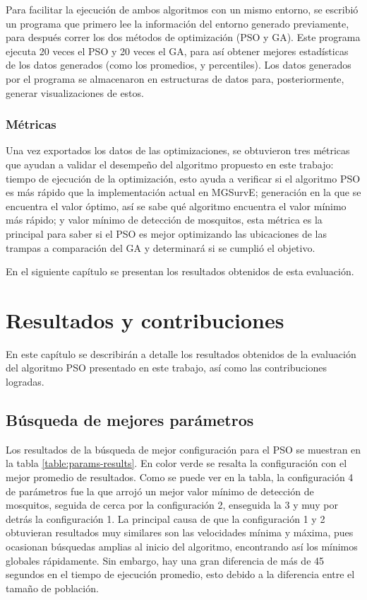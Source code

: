 \documentclass[letterpaper]{report}
\begin{document}
    Para facilitar la ejecución de ambos algoritmos con un mismo entorno, se
    escribió un programa que primero lee la información del entorno generado
    previamente, para después correr los dos métodos de optimización (PSO y
    GA). Este programa ejecuta 20 veces el PSO y 20 veces el GA, para así
    obtener mejores estadísticas de los datos generados (como los promedios, y
    percentiles). Los datos generados por el programa se almacenaron en
    estructuras de datos para, posteriormente, generar visualizaciones de estos.

    \subsection{Métricas}

    Una vez exportados los datos de las optimizaciones, se obtuvieron tres
    métricas que ayudan a validar el desempeño del algoritmo propuesto en este
    trabajo: tiempo de ejecución de la optimización, esto ayuda a verificar si
    el algoritmo PSO es más rápido que la implementación actual en MGSurvE;
    generación en la que se encuentra el valor óptimo, así se sabe qué algoritmo
    encuentra el valor mínimo más rápido; y valor mínimo de detección de
    mosquitos, esta métrica es la principal para saber si el PSO es mejor
    optimizando las ubicaciones de las trampas a comparación del GA y
    determinará si se cumplió el objetivo.

    En el siguiente capítulo se presentan los resultados obtenidos de esta
    evaluación.

\chapter{Resultados y contribuciones}
  En este capítulo se describirán a detalle los resultados obtenidos de la
  evaluación del algoritmo PSO presentado en este trabajo, así como las
  contribuciones logradas.

  \section{Búsqueda de mejores parámetros}\label{sect:busqueda-mejores-params}
    Los resultados de la búsqueda de mejor configuración para el PSO se muestran
    en la tabla \ref{table:params-results}. En color verde se resalta la
    configuración con el mejor promedio de resultados. Como se puede ver en la
    tabla, la configuración 4 de parámetros fue la que arrojó un mejor valor
    mínimo de detección de mosquitos, seguida de cerca por la configuración 2,
    enseguida la 3 y muy por detrás la configuración 1. La principal causa de
    que la configuración 1 y 2 obtuvieran resultados muy similares son las
    velocidades mínima y máxima, pues ocasionan búsquedas amplias al inicio del
    algoritmo, encontrando así los mínimos globales rápidamente. Sin embargo,
    hay una gran diferencia de más de 45 segundos en el tiempo de ejecución
    promedio, esto debido a la diferencia entre el tamaño de población.
\end{document}
